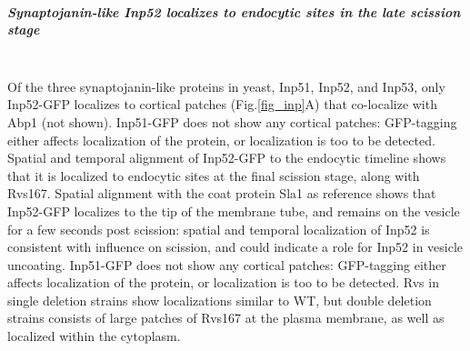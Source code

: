 		\subparagraph{Synaptojanin-like Inp52 localizes to endocytic sites in the late scission stage}
		\mbox{}\\
		Of the three synaptojanin-like proteins in yeast, Inp51, Inp52, and Inp53, only Inp52-GFP localizes to cortical patches (Fig.\ref{fig_inp}A) that co-localize with Abp1 (not shown). Inp51-GFP does not show any cortical patches: GFP-tagging either affects localization of the protein, or localization is too to be detected. Spatial and temporal alignment of Inp52-GFP to the endocytic timeline shows that it is localized to endocytic sites at the final scission stage, along with Rvs167. Spatial alignment with the coat protein Sla1 as reference shows that Inp52-GFP localizes to the tip of the membrane tube, and remains on the vesicle for a few seconds post scission: spatial and temporal localization of Inp52 is consistent with influence on scission, and could indicate a role for Inp52 in vesicle uncoating. Inp51-GFP does not show any cortical patches: GFP-tagging either affects localization of the protein, or localization is too to be detected. Rvs in single deletion strains show localizations similar to WT, but double deletion strains consists of large patches of Rvs167 at the plasma membrane, as well as localized within the cytoplasm. 
		
